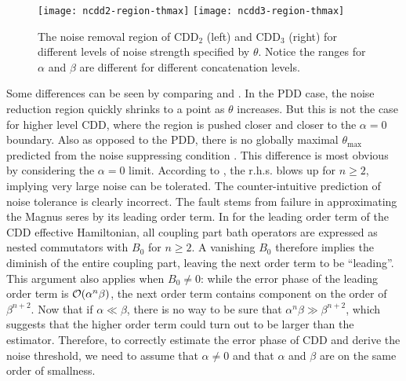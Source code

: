 \documentclass[aps,pra,reprint,superscriptaddress]{revtex4-2}
\begin{document}
\begin{figure}[htbp]
    \centering
    \texttt{[image: ncdd2-region-thmax]}\quad
    \texttt{[image: ncdd3-region-thmax]}
    \caption{The noise removal region of $\mathrm{CDD_2}$ (left) and $\mathrm{CDD_3}$ (right) for different levels of noise strength specified by $\theta$.
    Notice the ranges for $\alpha$ and $\beta$ are different for different concatenation levels. }
    \label{fig:ncdd-reg-thoery}
\end{figure}

Some differences can be seen by comparing  and . In the PDD case, the noise reduction region quickly shrinks to a point as $\theta$ increases. But this is not the case for higher level CDD, where the region is pushed closer and closer to the $\alpha=0$ boundary.
Also as opposed to the PDD, there is no globally maximal $\theta_{\max}$ predicted from the noise suppressing condition .
This difference is most obvious by considering the $\alpha=0$ limit. According to , the r.h.s. blows up for $n\ge2$, implying very large noise can be tolerated.  
The counter-intuitive prediction of noise tolerance is clearly incorrect.
The fault stems from failure in approximating the Magnus seres by its leading order term. In  for the leading order term of the CDD effective Hamiltonian, all coupling part bath operators are expressed as nested commutators with $B_0$ for $n\ge2$. A vanishing $B_0$ therefore implies the diminish of the entire coupling part, leaving the next order term to be ``leading''. This argument also applies when $B_0\ne0$: while the error phase of the leading order term is $\mathcal{O}(\alpha^n \beta)$, the next order term contains component on the order of $\beta^{n+2}$. Now that if $\alpha\ll \beta$, there is no way to be sure that $\alpha^n\beta \gg \beta^{n+2}$, which suggests that the higher order term could turn out to be larger than the estimator. Therefore, to correctly estimate the error phase of CDD and derive the noise threshold, we need to assume that $\alpha\neq 0$ and that $\alpha$ and $\beta$ are on the same order of smallness. 
\end{document}
